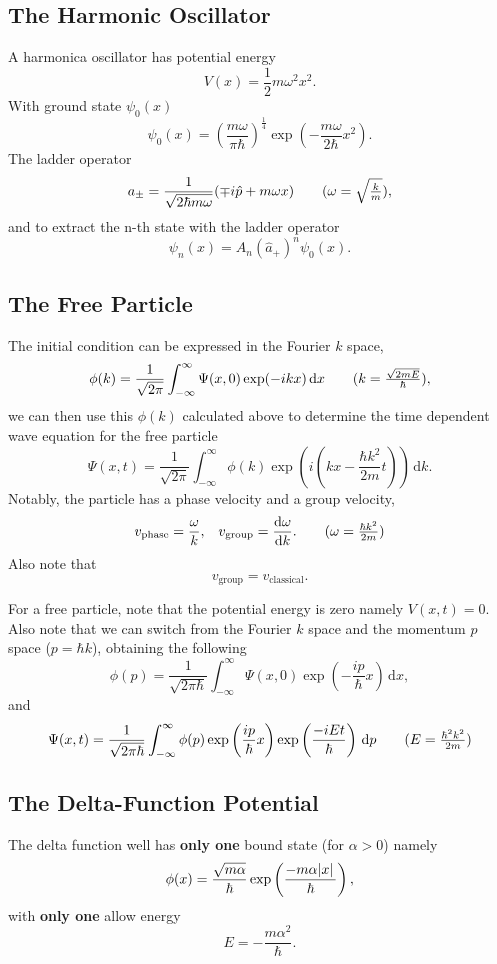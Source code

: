 \documentclass[a4paper]{article}
\newcommand{\dmr}[1]{\, \mathrm{d}#1} %
\begin{document}
\subsection{The Harmonic Oscillator}
\par A harmonica oscillator has potential energy
\begin{equation*}
    V(x) = \frac12 m \omega^2 x^2.
\end{equation*}
With ground state $\psi_{0}(x)$ 
\[
    \psi_0(x)=\left(\frac{m \omega}{\pi \hbar}\right)^{\frac{1}{4}}\exp\left(-\frac{m \omega}{2\hbar}x^2\right).
\]
The ladder operator
\[
    a_{\pm}=\frac{1}{\sqrt{2\hbar m \omega}}(\mp i \hat{p}+m\omega x)\tag{$\omega = \sqrt{\frac{k}{m}}$},
\]
and to extract the n-th state with the ladder operator
\[
    \psi_{n}(x)=A_n(\hat{a}_{+})^{n}\psi_{0}(x).
\]

\subsection{The Free Particle}
The initial condition can be expressed in the Fourier $k$ space,
\[
    \phi(k)=\frac{1}{\sqrt{2\pi}}\int_{-\infty}^{\infty}\Psi(x,0)\exp(-ikx)\dmr{x} \tag{\(k = \frac{\sqrt{2mE}}{\hbar}\)},
\]
we can then use this $\phi(k)$ calculated above to determine the time dependent wave equation for the free particle
\[
    \Psi(x,t)=\frac{1}{\sqrt{2\pi}}\int_{-\infty}^{\infty}\phi(k)\exp\left(i\left(kx-\frac{\hbar k^2}{2m}t\right)\right)\dmr{k}.
\]
Notably, the particle has a phase velocity and a group velocity,
\begin{align*}
    v_{\text{phase}}=\frac{\omega}{k}, && v_{\text{group}}=\dv{\omega}{k}.\tag{$\omega = \frac{\hbar k^2}{2m}$}
\end{align*}
Also note that 
\[
    v_{\text{group}} = v_{\text{classical}}.
\]

\par For a free particle, note that the potential energy is zero namely \(V(x,t)=0\). Also note that we can switch from the Fourier $k$ space and the momentum $p$ space (\(p = \hbar k\)), obtaining the following
\[
    \phi(p) = \frac{1}{\sqrt{2\pi\hbar}}\int_{-\infty}^{\infty}\Psi(x,0)\exp(-\frac{ip}{\hbar}x)\dmr{x},
\]
and
\[
    \Psi(x,t) = \frac{1}{\sqrt{2 \pi\hbar }}\int_{-\infty}^{\infty} \phi(p) \exp \left(\frac{ip}{\hbar}x\right)\exp\left(\frac{-i E t}{\hbar}\right) \dmr{p}\tag{$E = \frac{\hbar^2k^2}{2m}$}
\]  

\subsection{The Delta-Function Potential}
\par The delta function well has \textbf{only one} bound state (for $\alpha > 0$) namely
\[
    \phi(x) = \frac{\sqrt{m\alpha}}{\hbar}\exp\left(\frac{-m\alpha\abs*{x}}{\hbar}\right),    
\]
with \textbf{only one} allow energy
\[
    E = -\frac{m\alpha^2}{\hbar}.
\]
\end{document}
